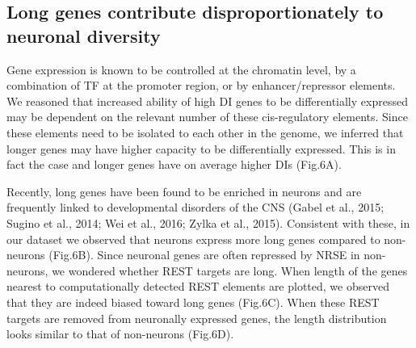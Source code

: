 \subsection{Long genes contribute disproportionately to neuronal diversity}

Gene expression is known to be controlled at the chromatin level, by a combination of TF at the promoter region, or by enhancer/repressor elements. We reasoned that increased ability of high DI genes to be differentially expressed may be dependent on the relevant number of these cis-regulatory elements. Since these elements need to be isolated to each other in the genome, we inferred that longer genes may have higher capacity to be differentially expressed. This is in fact the case and longer genes have on average higher DIs (Fig.6A).

Recently, long genes have been found to be enriched in neurons and are frequently linked to developmental disorders of the CNS (Gabel et al., 2015; Sugino et al., 2014; Wei et al., 2016; Zylka et al., 2015). Consistent with these, in our dataset we observed that neurons express more long genes compared to non-neurons (Fig.6B). Since neuronal genes are often repressed by NRSE in non-neurons, we wondered whether REST targets are long. When length of the genes nearest to computationally detected REST elements are plotted, we observed that they are indeed biased toward long genes (Fig.6C). When these REST targets are removed from neuronally expressed genes, the length distribution looks similar to that of non-neurons (Fig.6D).
